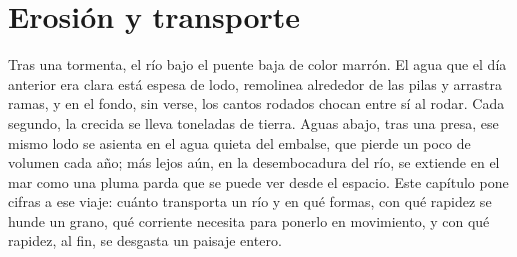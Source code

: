 \chapter{Erosión y transporte}\label{ch:b1:erosion-transport}

Tras una tormenta, el río bajo el puente baja de color marrón. El agua que el día anterior era clara está espesa de lodo, remolinea alrededor
de las pilas y arrastra ramas, y en el fondo, sin verse, los cantos rodados chocan entre sí al rodar. Cada segundo, la crecida se lleva toneladas
de tierra. Aguas abajo, tras una presa, ese mismo lodo se asienta en el agua quieta del embalse, que pierde un poco de volumen cada año; más lejos
aún, en la desembocadura del río, se extiende en el mar como una pluma parda que se puede ver desde el espacio. Este capítulo pone cifras a ese
viaje: cuánto transporta un río y en qué formas, con qué rapidez se hunde un grano, qué corriente necesita para ponerlo en movimiento, y con qué
rapidez, al fin, se desgasta un paisaje entero.

